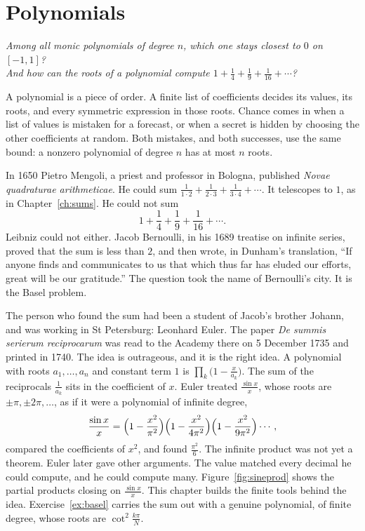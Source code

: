 \chapter{Polynomials}\label{ch:polynomials}

\begin{center}\itshape
Among all monic polynomials of degree $n$, which one stays closest to $0$ on $[-1,1]$?\\
And how can the roots of a polynomial compute $1+\frac14+\frac19+\frac1{16}+\cdots$?
\end{center}

A polynomial is a piece of order. A finite list of coefficients decides its values, its roots, and every symmetric expression in those roots. Chance comes in when a list of values is mistaken for a forecast, or when a secret is hidden by choosing the other coefficients at random. Both mistakes, and both successes, use the same bound: a nonzero polynomial of degree $n$ has at most $n$ roots.

In 1650 Pietro Mengoli, a priest and professor in Bologna, published \emph{Novae quadraturae arithmeticae}. He could sum $\frac1{1\cdot2}+\frac1{2\cdot3}+\frac1{3\cdot4}+\cdots$. It telescopes to $1$, as in Chapter~\ref{ch:sums}. He could not sum
\[
1+\frac14+\frac19+\frac1{16}+\cdots.
\]
Leibniz could not either. Jacob Bernoulli, in his 1689 treatise on infinite series, proved that the sum is less than $2$, and then wrote, in Dunham's translation, ``If anyone finds and communicates to us that which thus far has eluded our efforts, great will be our gratitude.'' The question took the name of Bernoulli's city. It is the Basel problem.

The person who found the sum had been a student of Jacob's brother Johann, and was working in St Petersburg: Leonhard Euler. The paper \emph{De summis serierum reciprocarum} was read to the Academy there on 5 December 1735 and printed in 1740. The idea is outrageous, and it is the right idea. A polynomial with roots $a_1,\dots,a_n$ and constant term $1$ is $\prod_k\bigl(1-\frac x{a_k}\bigr)$. The sum of the reciprocals $\frac1{a_k}$ sits in the coefficient of $x$. Euler treated $\frac{\sin x}x$, whose roots are $\pm\pi,\pm2\pi,\dots$, as if it were a polynomial of infinite degree,
\[
\frac{\sin x}x=\Bigl(1-\frac{x^2}{\pi^2}\Bigr)\Bigl(1-\frac{x^2}{4\pi^2}\Bigr)\Bigl(1-\frac{x^2}{9\pi^2}\Bigr)\cdots,
\]
compared the coefficients of $x^2$, and found $\frac{\pi^2}6$. The infinite product was not yet a theorem. Euler later gave other arguments. The value matched every decimal he could compute, and he could compute many. Figure~\ref{fig:sineprod} shows the partial products closing on $\frac{\sin x}x$. This chapter builds the finite tools behind the idea. Exercise~\ref{ex:basel} carries the sum out with a genuine polynomial, of finite degree, whose roots are $\cot^2\frac{k\pi}N$.

